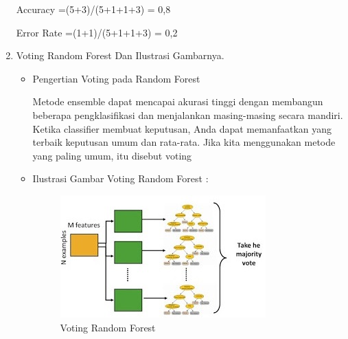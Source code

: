 \begin{enumerate}
Accuracy =(5+3)/(5+1+1+3) = 0,8

Error Rate =(1+1)/(5+1+1+3) = 0,2

\item Voting Random Forest Dan Ilustrasi Gambarnya.

\begin{itemize}
\item Pengertian Voting pada Random Forest

Metode ensemble dapat mencapai akurasi tinggi dengan membangun beberapa pengklasifikasi dan menjalankan masing-masing secara mandiri. Ketika classifier membuat keputusan, Anda dapat memanfaatkan yang terbaik keputusan umum dan rata-rata. Jika kita menggunakan metode yang paling umum, itu disebut voting

\item Ilustrasi Gambar Voting Random Forest :
\begin{figure}[ht]
\centering
\includegraphics[scale=0.8]{figures/Chapter3AnnisaFathoroni4.jpg}
\caption{Voting Random Forest}
\label{contoh}
\end{figure}
\end{itemize}
\end{enumerate}
